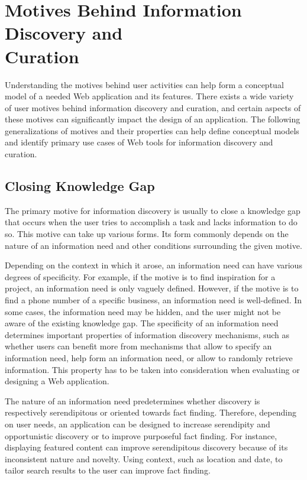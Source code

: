 {\section{Motives Behind Information Discovery and \\ Curation}
Understanding the motives behind user activities can help form a conceptual model of a needed Web application and its features. There exists a wide variety of user motives behind information discovery and curation, and certain aspects of these motives can significantly impact the design of an application. The following generalizations of motives and their properties can help define conceptual models and identify primary use cases of Web tools for information discovery and curation.  

{\subsection{Closing Knowledge Gap}
The primary motive for information discovery is usually to close a knowledge gap that occurs when the user tries to accomplish a task and lacks information to do so. This motive can take up various forms. Its form commonly depends on the nature of an information need and other conditions surrounding the given motive.        

Depending on the context in which it arose, an information need can have various degrees of specificity. For example, if the motive is to find inspiration for a project, an information need is only vaguely defined. However, if the motive is to find a phone number of a specific business, an information need is well-defined. In some cases, the information need may be hidden, and the user might not be aware of the existing knowledge gap. The specificity of an information need determines important properties of information discovery mechanisms, such as whether users can benefit more from mechanisms that allow to specify an information need, help form an information need, or allow to randomly retrieve information. This property has to be taken into consideration when evaluating or designing a Web application. 

The nature of an information need predetermines whether discovery is respectively serendipitous or oriented towards fact finding. Therefore, depending on user needs, an application can be designed to increase serendipity and opportunistic discovery or to improve purposeful fact finding. For instance, displaying featured content can improve serendipitous discovery because of its inconsistent nature and novelty. Using context, such as location and date, to tailor search results to the user can improve fact finding. 

}}
